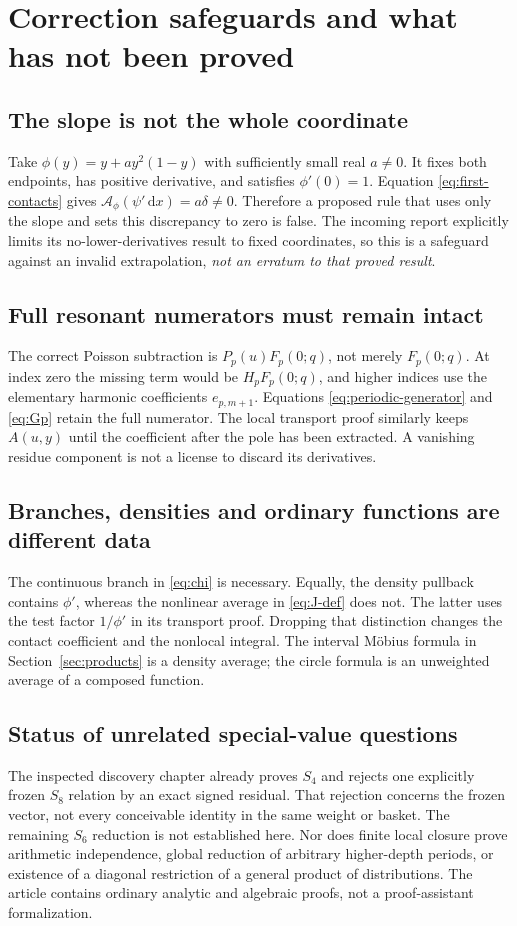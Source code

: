 \documentclass[11pt]{article}
\theoremstyle{definition}\newtheorem{definition}[theorem]{Definition}
\theoremstyle{remark}\newtheorem{remark}[theorem]{Remark}
\newcommand{\dd}{\,\mathrm d}
\newcommand{\Ac}{\mathcal A}
\begin{document}
\section{Correction safeguards and what has not been proved}
\label{sec:audit}
\subsection{The slope is not the whole coordinate}
Take
$\phi(y)=y+ay^2(1-y)$ with sufficiently small real $a\ne0$.
It fixes both endpoints, has positive derivative, and satisfies $\phi'(0)=1$.
Equation \eqref{eq:first-contacts} gives
$\Ac_\phi(\psi'\dd x)=a\delta\ne0$.
Therefore a proposed rule that uses only the slope and sets this discrepancy to zero is false. The incoming report explicitly limits its no-lower-derivatives result to fixed coordinates, so this is a safeguard against an invalid extrapolation, \emph{not an erratum to that proved result}.

\subsection{Full resonant numerators must remain intact}
The correct Poisson subtraction is $P_p(u)F_p(0;q)$, not merely $F_p(0;q)$. At index zero the missing term would be $H_pF_p(0;q)$, and higher indices use the elementary harmonic coefficients $e_{p,m+1}$. Equations \eqref{eq:periodic-generator} and \eqref{eq:Gp} retain the full numerator. The local transport proof similarly keeps $A(u,y)$ until the coefficient after the pole has been extracted. A vanishing residue component is not a license to discard its derivatives.

\subsection{Branches, densities and ordinary functions are different data}
The continuous branch in \eqref{eq:chi} is necessary. Equally, the density pullback contains $\phi'$, whereas the nonlinear average in \eqref{eq:J-def} does not. The latter uses the test factor $1/\phi'$ in its transport proof. Dropping that distinction changes the contact coefficient and the nonlocal integral. The interval M\"obius formula in Section~\ref{sec:products} is a density average; the circle formula is an unweighted average of a composed function.

\subsection{Status of unrelated special-value questions}
The inspected discovery chapter already proves $S_4$ and rejects one explicitly frozen $S_8$ relation by an exact signed residual. That rejection concerns the frozen vector, not every conceivable identity in the same weight or basket. The remaining $S_6$ reduction is not established here. Nor does finite local closure prove arithmetic independence, global reduction of arbitrary higher-depth periods, or existence of a diagonal restriction of a general product of distributions. The article contains ordinary analytic and algebraic proofs, not a proof-assistant formalization.
\end{document}
